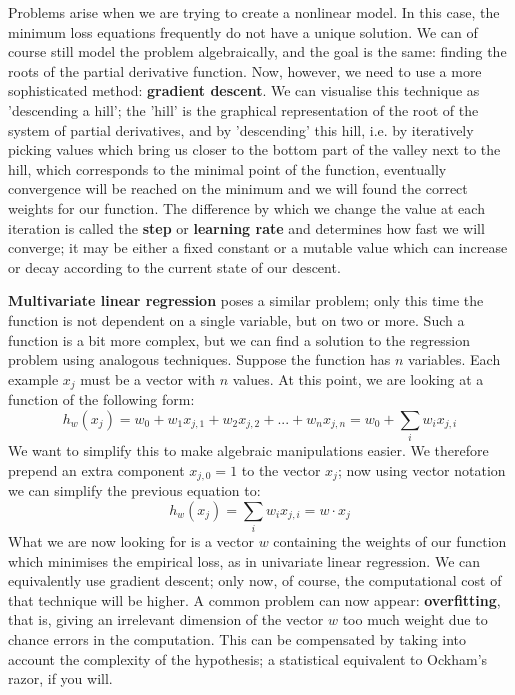     Problems arise when we are trying to create a nonlinear model. In
    this case, the minimum loss equations frequently do not have a unique
    solution. We can of course still model the problem algebraically, and
    the goal is the same: finding the roots of the partial derivative
    function. Now, however, we need to use a more sophisticated method:
    \textbf{gradient descent}. We can visualise this technique as
    'descending a hill'; the 'hill' is the graphical representation of the
    root of the system of partial derivatives, and by 'descending' this
    hill, i.e. by iteratively picking values which bring us closer to the
    bottom part of the valley next to the hill, which corresponds to the
    minimal point of the function, eventually convergence will be reached
    on the minimum and we will found the correct weights for our
    function. The difference by which we change the value at each
    iteration is called the \textbf{step} or \textbf{learning rate} and
    determines how fast we will converge; it may be either a fixed
    constant or a mutable value which can increase or decay according to
    the current state of our descent.

    \textbf{Multivariate linear regression} poses a similar problem;
    only this time the function is not dependent on a single variable, but
    on two or more. Such a function is a bit more complex, but we can
    find a solution to the regression problem using analogous
    techniques. Suppose the function has $n$ variables. Each example $x_j$
    must be a vector with $n$ values. At this point, we are looking at a
    function of the following form:
    \begin{equation}
      h_w(x_j) = w_0 + w_1x_{j,1} + w_2x_{j,2} + ... + w_nx_{j,n} = w_0 + \sum\limits_{i} w_ix_{j,i}
    \end{equation}
    We want to simplify this to make algebraic manipulations
    easier. We therefore prepend an extra component $x_{j,0} = 1$ to the
    vector $x_j$; now using vector notation we can simplify the
    previous equation to:
    \begin{equation}
      h_w(x_j) = \sum\limits_{i} w_ix_{j,i} = w \cdot x_j
    \end{equation}
    What we are now looking for is a vector $w$ containing the weights
of our function which minimises the empirical loss, as in univariate
linear regression. We can equivalently use gradient descent; only now,
of course, the computational cost of that technique will be higher. A
common problem can now appear: \textbf{overfitting}, that is, giving
an irrelevant dimension of the vector $w$ too much weight due to
chance errors in the computation. This can be compensated by taking
into account the complexity of the hypothesis; a statistical
equivalent to Ockham's razor, if you will.

